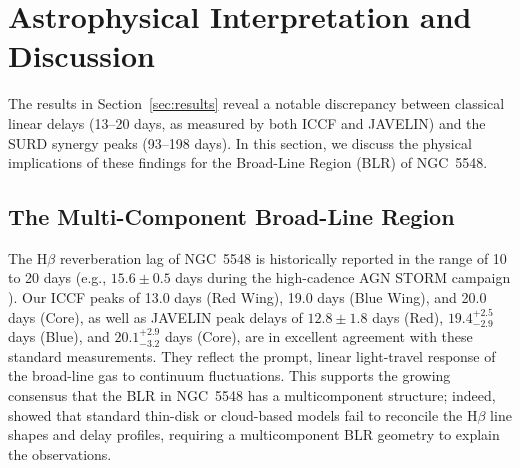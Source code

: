 \documentclass[fleqn,usenatbib]{mnras}
\begin{document}
\section{Astrophysical Interpretation and Discussion}
\label{sec:discussion}

The results in Section~\ref{sec:results} reveal a notable discrepancy between classical linear delays (13--20 days, as measured by both ICCF and JAVELIN) and the SURD synergy peaks (93--198 days). In this section, we discuss the physical implications of these findings for the Broad-Line Region (BLR) of NGC~5548.

\subsection{The Multi-Component Broad-Line Region}

The H\(\beta\) reverberation lag of NGC~5548 is historically reported in the range of 10 to 20 days (e.g., $15.6 \pm 0.5$ days during the high-cadence AGN STORM campaign \cite{Pei2017}). Our ICCF peaks of 13.0 days (Red Wing), 19.0 days (Blue Wing), and 20.0 days (Core), as well as JAVELIN peak delays of $12.8 \pm 1.8$ days (Red), $19.4_{-2.9}^{+2.5}$ days (Blue), and $20.1_{-3.2}^{+2.9}$ days (Core), are in excellent agreement with these standard measurements. They reflect the prompt, linear light-travel response of the broad-line gas to continuum fluctuations. This supports the growing consensus that the BLR in NGC~5548 has a multicomponent structure; indeed, \citet{LongDexter2025} showed that standard thin-disk or cloud-based models fail to reconcile the H\(\beta\) line shapes and delay profiles, requiring a multicomponent BLR geometry to explain the observations.
\end{document}
